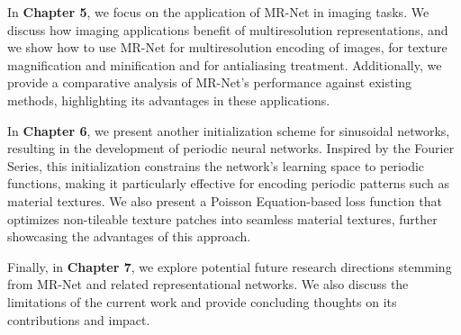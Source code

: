 In \textbf{Chapter 5}, we focus on the application of MR-Net in imaging tasks. We discuss how imaging applications benefit of multiresolution representations, and we show how to use MR-Net for multiresolution encoding of images, for texture magnification and minification and for antialiasing treatment. Additionally, we provide a comparative analysis of MR-Net's performance against existing methods, highlighting its advantages in these applications.

In \textbf{Chapter 6}, we present another initialization scheme for sinusoidal networks, resulting in the development of periodic neural networks. Inspired by the Fourier Series, this initialization constrains the network's learning space to periodic functions, making it particularly effective for encoding periodic patterns such as material textures. We also present a Poisson Equation-based loss function that optimizes non-tileable texture patches into seamless material textures, further showcasing the advantages of this approach.

Finally, in \textbf{Chapter 7}, we explore potential future research directions stemming from MR-Net and related representational networks. We also discuss the limitations of the current work and provide concluding thoughts on its contributions and impact.
